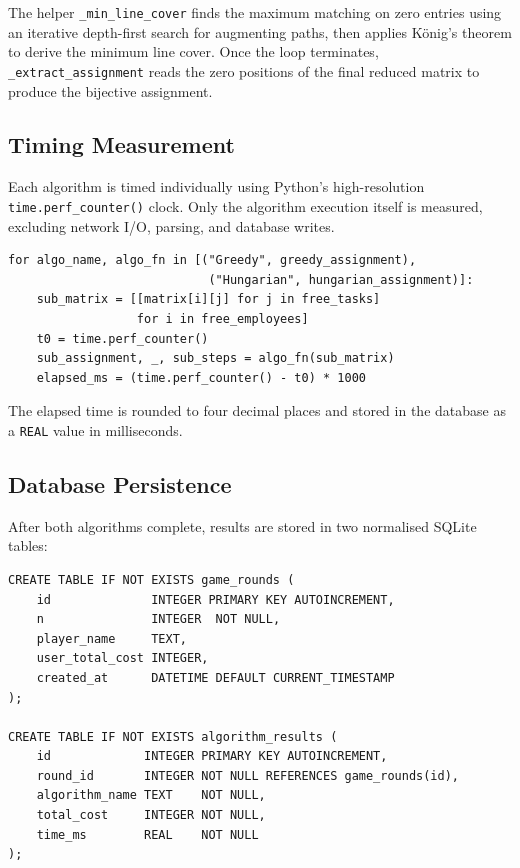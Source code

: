 \documentclass[12pt,a4paper]{article}
\begin{document}
\noindent
The helper \texttt{\_min\_line\_cover} finds the maximum matching on zero entries
using an iterative depth-first search for augmenting paths, then applies König's
theorem to derive the minimum line cover. Once the loop terminates,
\texttt{\_extract\_assignment} reads the zero positions of the final reduced matrix
to produce the bijective assignment.

\subsection{Timing Measurement}

Each algorithm is timed individually using Python's high-resolution
\texttt{time.perf\_counter()} clock. Only the algorithm execution itself is measured,
excluding network I/O, parsing, and database writes.

\needspace{6cm}
\begin{lstlisting}[caption={Timing capture -- backend/main.py}]
for algo_name, algo_fn in [("Greedy", greedy_assignment),
                            ("Hungarian", hungarian_assignment)]:
    sub_matrix = [[matrix[i][j] for j in free_tasks]
                  for i in free_employees]
    t0 = time.perf_counter()
    sub_assignment, _, sub_steps = algo_fn(sub_matrix)
    elapsed_ms = (time.perf_counter() - t0) * 1000
\end{lstlisting}

\noindent
The elapsed time is rounded to four decimal places and stored in the database as a
\texttt{REAL} value in milliseconds.

\subsection{Database Persistence}

After both algorithms complete, results are stored in two normalised SQLite tables:

\needspace{8cm}
\begin{lstlisting}[style=sqlstyle, caption={Database schema -- backend/database.py}]
CREATE TABLE IF NOT EXISTS game_rounds (
    id              INTEGER PRIMARY KEY AUTOINCREMENT,
    n               INTEGER  NOT NULL,
    player_name     TEXT,
    user_total_cost INTEGER,
    created_at      DATETIME DEFAULT CURRENT_TIMESTAMP
);

CREATE TABLE IF NOT EXISTS algorithm_results (
    id             INTEGER PRIMARY KEY AUTOINCREMENT,
    round_id       INTEGER NOT NULL REFERENCES game_rounds(id),
    algorithm_name TEXT    NOT NULL,
    total_cost     INTEGER NOT NULL,
    time_ms        REAL    NOT NULL
);
\end{lstlisting}
\end{document}
